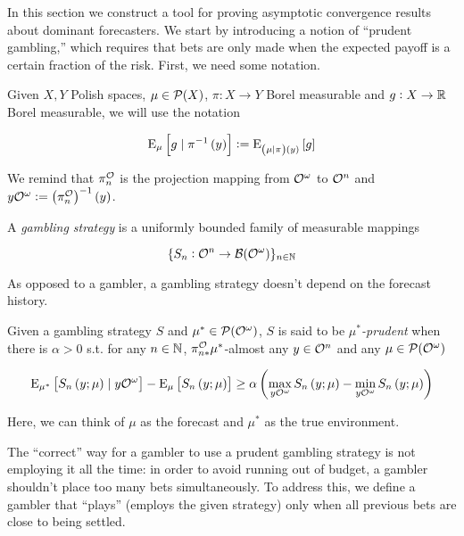 In this section we construct a tool for proving asymptotic convergence results about dominant forecasters. We start by introducing a notion of \enquote{prudent gambling,} which requires that bets are only made when the expected payoff is a certain fraction of the risk. First, we need some notation.

Given $X,Y$ Polish spaces, $\mu \in \mathcal{P}(X)$, $\pi: X \rightarrow Y$ Borel measurable and $g: X \rightarrow \mathbb{R}$ Borel measurable, we will use the notation 

\begin{equation}
\operatorname{E}_{\mu}\left[g \mid \pi^{-1}\left(y\right)\right]:=\operatorname{E}_{\left(\mu \mid \pi\right)\left(y\right)}\left[g\right]
\end{equation}

We remind that $\pi^{\mathcal{O}}_n$ is the projection mapping from $\mathcal{O}^\omega$ to $\mathcal{O}^n$ and $y\mathcal{O}^\omega:= \left(\pi^{\mathcal{O}}_{n}\right)^{-1}\left(y\right)$.

\begin{definition}

A \emph{gambling strategy} is a uniformly bounded family of measurable mappings

\[\{S_n: \mathcal{O}^n \rightarrow \mathcal{B}(\mathcal{O}^\omega)\}_{n \in \mathbb{N}}\]

\end{definition}

As opposed to a gambler, a gambling strategy doesn't depend on the forecast history.

\begin{definition}
\label{def:prudent}

Given a gambling strategy $S$ and $\mu^* \in \mathcal{P}(\mathcal{O}^\omega)$, $S$ is said to be \emph{$\mu^*$-prudent} when there is $\alpha > 0$ s.t. for any $n \in \mathbb{N}$, $\pi^{\mathcal{O}}_{n*} \mu^*$-almost any $y \in \mathcal{O}^n$ and any $\mu \in \mathcal{P}(\mathcal{O}^\omega)$

\begin{equation}
\operatorname{E}_{\mu^*}\left[S_n\left(y; \mu\right) \mid y\mathcal{O}^\omega\right] - \operatorname{E}_\mu\left[S_n\left(y; \mu\right)\right] \geq \alpha \left(\max_{y\mathcal{O}^\omega}{S_n\left(y; \mu\right)} - \min_{y\mathcal{O}^\omega}{S_n\left(y; \mu\right)}\right)
\end{equation}

\end{definition}

Here, we can think of $\mu$ as the forecast and $\mu^*$ as the true environment. 

The \enquote{correct} way for a gambler to use a prudent gambling strategy is not employing it all the time: in order to avoid running out of budget, a gambler shouldn’t place too many bets simultaneously. To address this, we define a gambler that \enquote{plays} (employs the given strategy) only when all previous bets are close to being settled.


